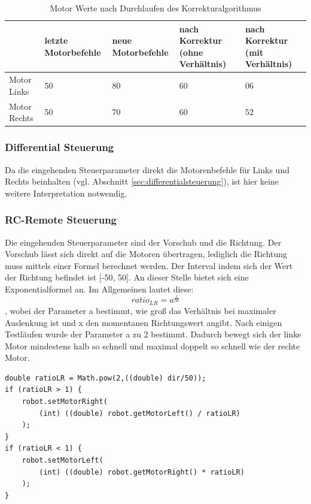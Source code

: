 \vspace{1cm}

\begin{table}[h!]
	\begin{tabularx}{\textwidth}{|X|X|X|X|X|}
		\hline
		 & letzte Motorbefehle & neue Motorbefehle & nach Korrektur (ohne Verhältnis) & nach Korrektur (mit Verhältnis) \\ \hline
		Motor Links      & 50      & 80      & 60      &
		06  \\
		Motor Rechts      & 50      & 70      & 60
		& 52 \\ \hline
	\end{tabularx}
	\caption{Motor Werte nach Durchlaufen des Korrekturalgorithmus}
	\label{tab:bsp_korrektur}
\end{table}



\subsubsection{Differential Steuerung}
Da die eingehenden Steuerparameter direkt die Motorenbefehle für Links und Rechts beinhalten (vgl. Abschnitt \ref{sec:differentialsteuerung}), ist hier keine weitere Interpretation notwendig. 

\subsubsection{RC-Remote Steuerung}
\label{sec:rcremote_server}
Die eingehenden Steuerparameter sind der Vorschub und die Richtung. Der Vorschub lässt sich direkt auf die Motoren übertragen, lediglich die Richtung muss mittels einer Formel berechnet werden. Der Interval indem sich der Wert der Richtung befindet ist [-50, 50]. An dieser Stelle bietet sich eine Exponentialformel an. 
Im Allgemeinen lautet diese: 
{\Large \[ratio_{LR} = a^{\frac{x}{50}}\]},
wobei der Parameter a bestimmt, wie groß das Verhältnis bei maximaler Auslenkung ist und x den momentanen Richtungswert angibt.
Nach einigen Testläufen wurde der Parameter a zu 2 bestimmt. Dadurch bewegt sich der linke Motor mindestens halb so schnell und maximal doppelt so schnell wie der rechte Motor.

\begin{lstlisting}
double ratioLR = Math.pow(2,((double) dir/50));
if (ratioLR > 1) {
	robot.setMotorRight(
		(int) ((double) robot.getMotorLeft() / ratioLR)
	); 
}
if (ratioLR < 1) {
	robot.setMotorLeft(
		(int) ((double) robot.getMotorRight() * ratioLR)
	);
}
\end{lstlisting}


